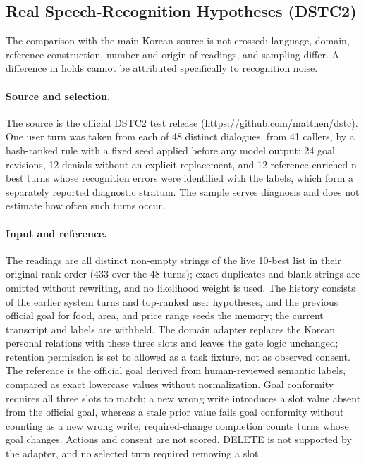 \documentclass[acmsmall,review]{acmart}
\begin{document}
\subsection{Real Speech-Recognition Hypotheses (DSTC2)}
The comparison with the main Korean source is not crossed: language, domain, reference construction, number and origin of readings, and sampling differ. A difference in holds cannot be attributed specifically to recognition noise.

\paragraph{Source and selection.} The source is the official DSTC2 test release (\url{https://github.com/matthen/dstc}). One user turn was taken from each of 48 distinct dialogues, from 41 callers, by a hash-ranked rule with a fixed seed applied before any model output: 24 goal revisions, 12 denials without an explicit replacement, and 12 reference-enriched n-best turns whose recognition errors were identified with the labels, which form a separately reported diagnostic stratum. The sample serves diagnosis and does not estimate how often such turns occur.

\paragraph{Input and reference.} The readings are all distinct non-empty strings of the live 10-best list in their original rank order (433 over the 48 turns); exact duplicates and blank strings are omitted without rewriting, and no likelihood weight is used. The history consists of the earlier system turns and top-ranked user hypotheses, and the previous official goal for food, area, and price range seeds the memory; the current transcript and labels are withheld. The domain adapter replaces the Korean personal relations with these three slots and leaves the gate logic unchanged; retention permission is set to allowed as a task fixture, not as observed consent. The reference is the official goal derived from human-reviewed semantic labels, compared as exact lowercase values without normalization. Goal conformity requires all three slots to match; a new wrong write introduces a slot value absent from the official goal, whereas a stale prior value fails goal conformity without counting as a new wrong write; required-change completion counts turns whose goal changes. Actions and consent are not scored. DELETE is not supported by the adapter, and no selected turn required removing a slot.
\end{document}
